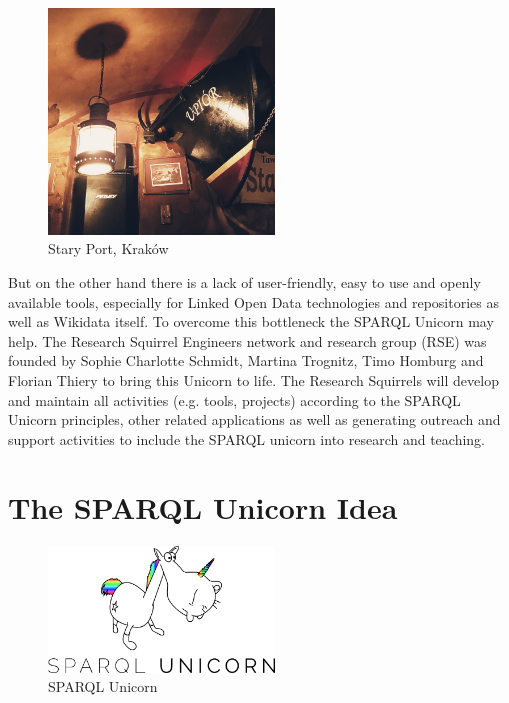 \documentclass[twocolumn]{autart}
\begin{document}
\begin{figure}[!htb]
\begin{center}
\includegraphics[width=6cm]{20190423_213750.jpg}
\caption{Stary Port, Kraków}
\label{rq1}
\end{center}
\end{figure}

But on the other hand there is a lack of user-friendly, easy to use and openly available tools, especially for Linked Open Data technologies and repositories as well as Wikidata itself. To overcome this bottleneck the SPARQL Unicorn may help. The Research Squirrel Engineers network and research group (RSE) was founded by Sophie Charlotte Schmidt, Martina Trognitz, Timo Homburg and Florian Thiery to bring this Unicorn to life. The Research Squirrels will develop and maintain all activities (e.g. tools, projects) according to the SPARQL Unicorn principles, other related applications as well as generating outreach and support activities to include the SPARQL unicorn into research and teaching. 

\section{The SPARQL Unicorn Idea}

\begin{figure}[!htb]
\begin{center}
\includegraphics[width=6cm]{sparqlunicorn_logo.png}
\caption{SPARQL Unicorn}
\label{rq1}
\end{center}
\end{figure}
\end{document}
